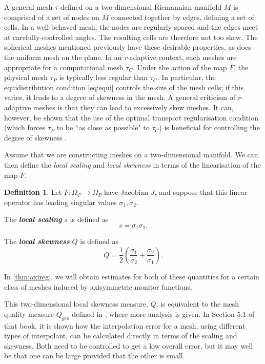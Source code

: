 \documentclass[11pt, a4paper]{scrartcl}  %
\theoremstyle{plain}
\theoremstyle{definition}
\newtheorem{definition}{Definition}
\numberwithin{equation}{section}
\begin{document}
A general mesh $\tau$ defined on a two-dimensional Riemannian manifold
$M$ is comprised of a set of nodes on $M$ connected together by edges,
defining a set of cells. In a well-behaved mesh, the nodes are regularly
spaced and the edges meet at carefully-controlled angles. The resulting
cells are therefore not too skew. The spherical meshes mentioned
previously have these desirable properties, as does the uniform mesh on
the plane. In an \emph{r}-adaptive context, such meshes are appropriate
for a computational mesh $\tau_C$. Under the action of the map $F$, the
physical mesh $\tau_P$ is typically less regular than $\tau_C$. In
particular, the equidistribution condition \cref{eq:equi} controls the
size of the mesh cells; if this varies, it leads to a degree of skewness
in the mesh. A general criticism of \emph{r}-adaptive meshes is that
they can lead to excessively skew meshes. It can, however, be shown that
the use of the optimal transport regularisation condition (which forces
$\tau_P$ to be ``as close as possible" to $\tau_C$) is beneficial for
controlling the degree of skewness \citep{delzanno2008optimal}.

Assume that we are constructing meshes on a two-dimensional manifold.
We can then define the \emph{local scaling} and \emph{local skewness} in
terms of the linearisation of the map $F$.
\begin{definition}
Let $F: \Omega_C \to \Omega_P$ have Jacobian $J$, and suppose that this
linear operator has leading singular values $\sigma_1, \sigma_2$.

The \emph{\textbf{local scaling}} $s$ is defined as
\begin{equation}
  \label{eq:locscale}
  s = \sigma_1 \sigma_2.
\end{equation}

The \emph{\textbf{local skewness}} $Q$ is defined as
\begin{equation}
  \label{eq:locskew}
  Q = \frac{1}{2} \left(\frac{\sigma_1}{\sigma_2} + \frac{\sigma_2}{\sigma_1}\right).
\end{equation}
\end{definition}

In \cref{thm:axireg}, we will obtain estimates for both of these
quantities for a certain class of meshes induced by axisymmetric monitor
functions.

This two-dimensional local skewness measure, $Q$, is equivalent to the
mesh quality measure $Q_{geo}$ defined in \citet[p.~205]{huang2011adaptive},
where more analysis is given. In Section 5.1 of that book, it is shown
how the interpolation error for a mesh, using different types of
interpolant, can be calculated directly in terms of the scaling and
skewness. Both need to be controlled to get a low overall error, but it
may well be that one can be large provided that the other is small.
\end{document}
